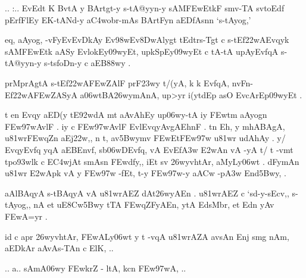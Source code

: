 \def\DevnagVersion{2.15}\documentclass{article}
\begin{document}
{\dn .. :.. EvEdt\2 K BvtA\2 y BArtgt-y s\2-tA@yyn-y sAM\3FEwEtkF{\qva} smv-TA\2 sv\0toEdf\2 pErfFlEy\2 \dn\dnnum {} EK-tANd-y a\3C4wobr{\rs -\re}mAs\? BArtFy\?n aEDfAsn\?n {\rs `\re}s\2-tAyog,{\rs '\re}}

{\dn eq, aAyog, -vFyEvEvDkAy\?{\qvb} Ev\398wEv\38DwAlygt\2 tEdtrs\2-Tgt\2 c s\2-tEf\322wAEvqyk\2 sAM\3FEwEtk aASy\2 EvlokEy\309wyEt{\rs ,\re} upkSpEy\309wyEt c tA\2-tA upAyEvf\?qA s\2-tA@yyn-y s\2-ts\2foDn-y c aEB\388wy\? .}

{\dn prMprAgtA\2 s\2-tEf\322wA\3FEwZAlF{\qva} prF\323wy t/(yA, k\? k\? Evf\?qA, nvFn{\rs -\re}Ef\322wA\3FEwZASyA a\306wtBA\0\326wymAnA, up>y\?r i(y\?tdEp asO EvcArEp\309wyEt .}

{\dn t en\2 Evqy aED(y tE\392wdA\2 mt aAvAhEy up\306wy-tA iy\2 \3FEwt\?m aAyog\?n \3FEw\397wAvlF . iy\2 c \3FEw\397wAvlF EvlEvqyAvgAEhnF . t\?n Eh{\rs ,\re} y\? mhABAgA, u\381wr\3FEw\?qZ\?n aEj\322w\?,{\rs ,\re} n t\4, av\35Bwym\?v \3FEwEt\3FEw\397w u\381wr udAhAy\0 . y/ EvqyEvf\?q\? y\?qA aEBEnv\?f, s\2b\306wDEvf\?q, vA EvEf\3A3w\2 \3E2wAn\2 vA -yA t/ t\? -vmt\2 tpo\393wlk\2 c E\3C4wjAt\2 smAs\?n \3FEwdf\0y\?,{\rs ,\re} iEt sv\?{\qvb} \326wyvhtA\0r,  aMyLy\0\306wt\? . dFymAn u\381wr\2 \3E2wApk\2 vA y\2 \3FEw\397w\2 -fEt{\rs ,\re} t-y \3FEw\397w-y a\3ACw -p\3A3w\2 End\?{\qvb}\35Bwy, . }

{\dn aAlBAqyA s\2-tBAqyA vA u\381wrAEZ dAt\326wyAEn . u\381wrAEZ c {\rs `\re}sd-y{\rs -\re}sEcv,{\rs ,\re} s\2-tAyog,{\rs ,\re} nA \dn\dnnum {} et uE\38Cw\35Bwy tTA \3FEw\?qZFyAEn{\rs ,\re} ytA  EdsMbr{\rs ,\re}  et Edn\2 yAv \3FEwA=y\?r .}

{\dn  id\2 c apr\2 \326wyvhtA\0r, \3FEwALy\0\306wt\?{\rs ,\re} y t\? -v\?qA u\381wrAZA avsAn\? Enj\2 smg\5\2 nAm{\rs ,\re} aEDkAr aAvAs-TAn\2 c ElK\?, ..}


{\dn .. a.. sAmA\306wy \3FEwkrZ {\rs -\re} ltA, k\?cn \3FEw\397wA, ..}
\end{document}
